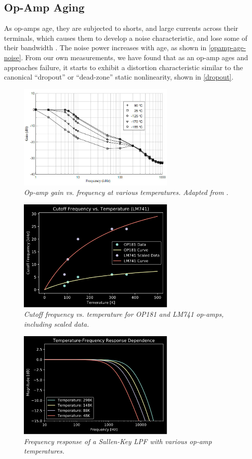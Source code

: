 \documentclass[twoside,a4paper]{article}
\begin{document}
\subsection{Op-Amp Aging} \label{sec:opamp-age}
%
As op-amps age, they are subjected to shorts, and large currents across
their terminals, which causes them to develop a noise characteristic,
and lose some of their bandwidth \cite{opamp-age}. The noise power
increases with age, as shown in \cref{opamp-age-noise}.
\newline\newline
From our own measurements, we have found that as an op-amp ages and
approaches failure, it starts to exhibit a distortion characteristic
similar to the canonical ``dropout'' or ``dead-zone'' static nonlinearity,
shown in \cref{dropout}.
%
\begin{figure}[h]
    \center
    \includegraphics[width=3in]{Pics/NASA.png}
    \caption{\label{NASA}{\it Op-amp gain vs. frequency at various
        temperatures. Adapted from \cite{opamp-temp}.}}
\end{figure}
%
\begin{figure}[h]
    \center
    \includegraphics[width=3in]{../OpAmp/Pics/freq_temp_shift.png}
    \caption{\label{opamp-temp}{\it Cutoff frequency vs. temperature for
        OP181 and LM741 op-amps, including scaled data.}}
\end{figure}
%
\begin{figure}[h]
    \center
    \includegraphics[width=3in]{../OpAmp/Pics/temp_freq_response.png}
    \caption{\label{opamp-temp-freq}{\it Frequency response of a Sallen-Key
        LPF with various op-amp temperatures.}}
\end{figure}
%
\end{document}
